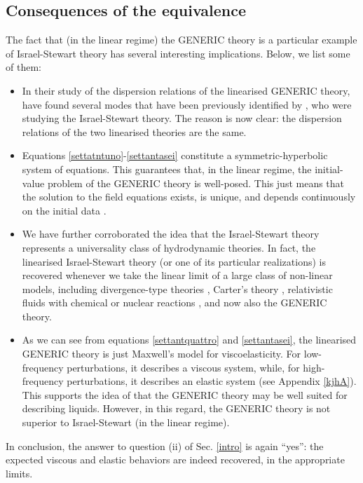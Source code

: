 \documentclass[a4paper, amsfonts, amssymb, amsmath, reprint, showkeys, nofootinbib, twoside, onecolumn, notitlepage]{revtex4-1}
\theoremstyle{definition}
\theoremstyle{theorem}
\begin{document}
\subsection{Consequences of the equivalence}

The fact that (in the linear regime) the GENERIC theory is a particular example of Israel-Stewart theory has several interesting implications. Below, we list some of them:
\begin{itemize}
%
\item In their study of the dispersion relations of the linearised GENERIC theory, \citet{Stricker2019} have found several modes that have been previously identified by \citet{Pu2010}, who were studying the Israel-Stewart theory. The reason is now clear: the dispersion relations of the two linearised theories are the same.
%
\item Equations \eqref{settatntuno}-\eqref{settantasei} constitute a symmetric-hyperbolic system of equations. This guarantees that, in the linear regime, the initial-value problem of the GENERIC theory is well-posed. This just means that the solution to the field equations exists, is unique, and depends continuously on the initial data \cite{Causality_bulk}.
%
\item We have further corroborated the idea that the Israel-Stewart theory represents a universality class of hydrodynamic theories. In fact, the linearised Israel-Stewart theory (or one of its particular realizations) is recovered whenever we take the linear limit of a large class of non-linear models, including divergence-type theories \cite{Liu1986,GerochLindblom1990}, Carter's theory \cite{PriouCOMPAR1991,GavassinoKhalatnikov2022}, relativistic fluids with chemical or nuclear reactions \cite{BulkGavassino,Camelio2022,CamelioSecondo2022}, and now also the GENERIC theory.
%
\item As we can see from equations \eqref{settantquattro} and \eqref{settantasei}, the linearised GENERIC theory is just Maxwell's model for viscoelasticity. For low-frequency perturbations, it describes a viscous system, while, for high-frequency perturbations, it describes an elastic system (see Appendix \ref{kjhA}). This supports the idea of \citet{Stricker2019} that the GENERIC theory may be well suited for describing liquids. However, in this regard, the GENERIC theory is not superior to Israel-Stewart (in the linear regime). 
%
\end{itemize}
In conclusion, the answer to question (ii) of Sec. \ref{intro} is again ``yes'': the expected viscous and elastic behaviors are indeed recovered, in the appropriate limits.
\end{document}
